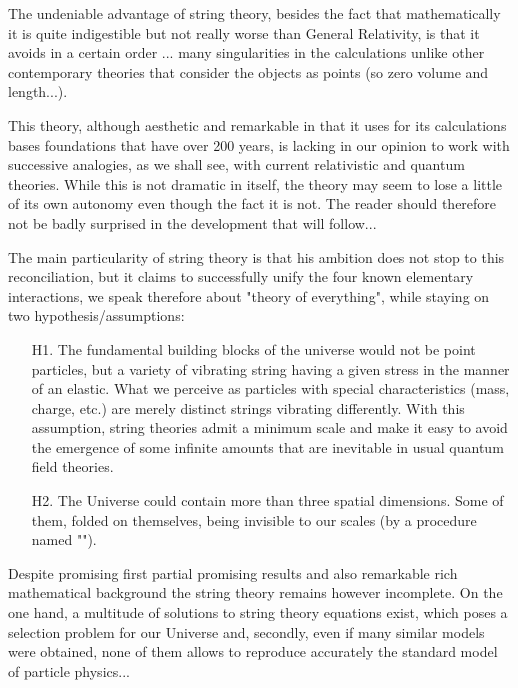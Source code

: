 	The undeniable advantage of string theory, besides the fact that mathematically it is quite indigestible but not really worse than General Relativity, is that it avoids in a certain order ... many singularities in the calculations unlike other contemporary theories that consider the objects as points (so zero volume and length...).
	
	This theory, although aesthetic and remarkable in that it uses for its calculations bases foundations that have over 200 years, is lacking in our opinion to work with successive analogies, as we shall see, with current relativistic and quantum theories. While this is not dramatic in itself, the theory may seem to lose a little of its own autonomy even though the fact it is not. The reader should therefore not be badly surprised in the development that will follow...
	
	The main particularity of string theory is that his ambition does not stop to this reconciliation, but it claims to successfully unify the four known elementary interactions, we speak therefore about "theory of everything", while staying on two hypothesis/assumptions:
	
	\begin{enumerate}
		\item[H1.] The fundamental building blocks of the universe would not be point particles, but a variety of vibrating string having a given stress in the manner of an elastic. What we perceive as particles with special characteristics (mass, charge, etc.) are merely distinct strings vibrating differently. With this assumption, string theories admit a minimum scale and make it easy to avoid the emergence of some infinite amounts that are inevitable in usual quantum field theories.
		\item[H2.] The Universe could contain more than three spatial dimensions. Some of them, folded on themselves, being invisible to our scales (by a procedure named "").
	\end{enumerate}
	
	Despite promising first partial promising results and also remarkable rich mathematical background the string theory remains however incomplete. On the one hand, a multitude of solutions to string theory equations exist, which poses a selection problem for our Universe and, secondly, even if many similar models were obtained, none of them allows to reproduce accurately the standard model of particle physics...
	
